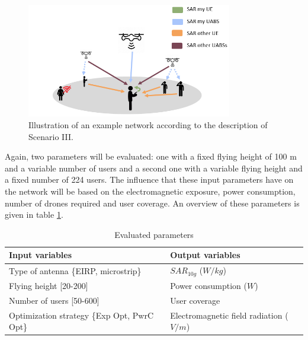 \begin{figure}[H]
\centering
  \includegraphics[width=0.8\textwidth]{../images/IllustrationS3.png}
  \caption{Illustration of an example network according to the description of Scenario III.}
  \label{fig:IllustrationS3}
\end{figure}

Again, two parameters will be evaluated: one with a fixed flying height of 100 m and a variable number of users and a second one with 
a variable flying height and a fixed number of 224 users.
The influence that these input parameters have on the network will be based on the electromagnetic exposure, power consumption, number of drones required and user coverage.
An overview of these parameters is given in table \ref{table:s3:evalpara}.

\begin{table}[!htb]
      \centering
            \begin{tabular}{|m{8cm}|m{7cm}|}
            \hline
            \textbf{Input variables  }                        & \textbf{Output variables}       \\   \hline 
            Type of antenna  \{EIRP, microstrip\}               & $SAR_{10g}$ ($W/kg$)                    \\ 
            Flying height    [20-200]                         & Power consumption ($W$)             \\ 
            Number of users  [50-600]                         & User coverage                   \\
            Optimization strategy \{Exp Opt, PwrC Opt\}         &   Electromagnetic field radiation ($V/m$)\\
            \hline
            \end{tabular}
                 \caption{Evaluated parameters}
          \label{table:s3:evalpara}
\end{table}


